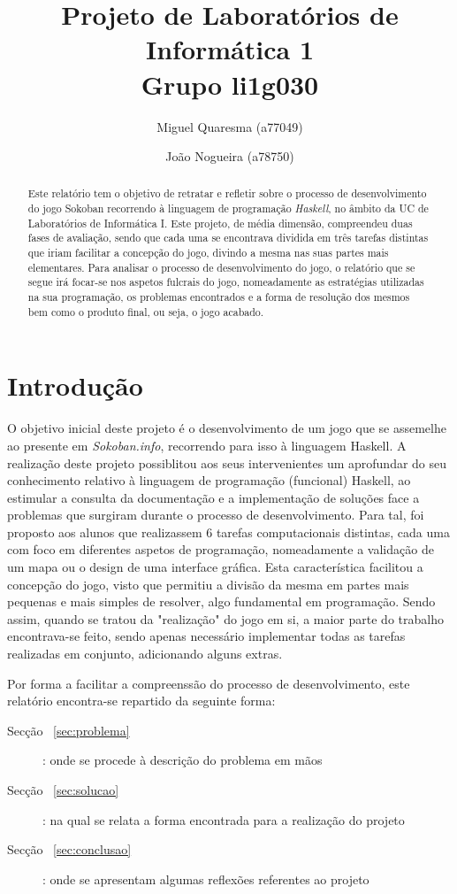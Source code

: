 \documentclass[a4paper]{article}
\title{Projeto de Laboratórios de Informática 1\\Grupo li1g030}
\author{Miguel Quaresma (a77049) \and João Nogueira (a78750)}
\begin{document}
\maketitle

\begin{abstract}

Este relatório tem o objetivo de retratar e refletir sobre o processo de desenvolvimento do jogo Sokoban recorrendo à linguagem de programação \textit{Haskell}, no âmbito da UC de Laboratórios de Informática I. Este projeto, de média dimensão, compreendeu duas fases de avaliação, sendo que cada uma se encontrava dividida em três tarefas distintas que iriam facilitar a concepção do jogo, divindo a mesma nas suas partes mais elementares. 
Para analisar o processo de desenvolvimento do jogo, o relatório que se segue irá focar-se nos aspetos fulcrais do jogo, nomeadamente as estratégias utilizadas na sua programação, os problemas encontrados e a forma de resolução dos mesmos bem como o produto final, ou seja, o jogo acabado. 

\end{abstract}

\tableofcontents

\section{Introdução}
\label{sec:intro}

O objetivo inicial deste projeto é o desenvolvimento de um jogo que se assemelhe ao presente em \textit{Sokoban.info}, recorrendo para isso à linguagem Haskell. A realização deste projeto possiblitou aos seus intervenientes um aprofundar do seu conhecimento relativo à linguagem de programação (funcional) Haskell, ao estimular a consulta da documentação e a implementação de soluções face a problemas que surgiram durante o processo de desenvolvimento. Para tal, foi proposto aos alunos que realizassem 6 tarefas computacionais distintas, cada uma com foco em diferentes aspetos de programação, nomeadamente a validação de um mapa ou o design de uma interface gráfica. Esta característica facilitou a concepção do jogo, visto que permitiu a divisão da mesma em partes mais pequenas e mais simples de resolver, algo fundamental em programação. Sendo assim, quando se tratou da "realização" do jogo em si, a maior parte do trabalho encontrava-se feito, sendo apenas necessário implementar todas as tarefas realizadas em conjunto, adicionando alguns extras.

Por forma a facilitar a compreenssão do processo de desenvolvimento, este relatório encontra-se repartido da seguinte forma:
\begin{description}
	\item [Secção ~\ref{sec:problema} ] : onde se procede à descrição do problema em mãos
	\item [Secção ~\ref{sec:solucao} ] : na qual se relata a forma encontrada para a realização do projeto
	\item [Secção ~\ref{sec:conclusao} ] : onde se apresentam algumas reflexões referentes ao projeto
\end{description}
\end{document}
